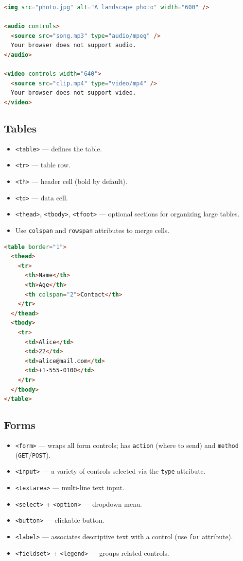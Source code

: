 \documentclass[hidelinks]{article}
\begin{document}
\begin{lstlisting}[language=HTML, caption={Media elements}]
<img src="photo.jpg" alt="A landscape photo" width="600" />

<audio controls>
  <source src="song.mp3" type="audio/mpeg" />
  Your browser does not support audio.
</audio>

<video controls width="640">
  <source src="clip.mp4" type="video/mp4" />
  Your browser does not support video.
</video>
\end{lstlisting}

\subsection{Tables}
\begin{itemize}
  \item \texttt{<table>} --- defines the table.
  \item \texttt{<tr>} --- table row.
  \item \texttt{<th>} --- header cell (bold by default).
  \item \texttt{<td>} --- data cell.
  \item \texttt{<thead>}, \texttt{<tbody>}, \texttt{<tfoot>} --- optional sections for organizing large tables.
  \item Use \texttt{colspan} and \texttt{rowspan} attributes to merge cells.
\end{itemize}

\begin{lstlisting}[language=HTML, caption={Table example with merged cell}]
<table border="1">
  <thead>
    <tr>
      <th>Name</th>
      <th>Age</th>
      <th colspan="2">Contact</th>
    </tr>
  </thead>
  <tbody>
    <tr>
      <td>Alice</td>
      <td>22</td>
      <td>alice@mail.com</td>
      <td>+1-555-0100</td>
    </tr>
  </tbody>
</table>
\end{lstlisting}

\subsection{Forms}
\begin{itemize}
  \item \texttt{<form>} --- wraps all form controls; has \texttt{action} (where to send) and \texttt{method} (\texttt{GET}/\texttt{POST}).
  \item \texttt{<input>} --- a variety of controls selected via the \texttt{type} attribute.
  \item \texttt{<textarea>} --- multi-line text input.
  \item \texttt{<select>} + \texttt{<option>} --- dropdown menu.
  \item \texttt{<button>} --- clickable button.
  \item \texttt{<label>} --- associates descriptive text with a control (use \texttt{for} attribute).
  \item \texttt{<fieldset>} + \texttt{<legend>} --- groups related controls.
\end{itemize}
\end{document}
